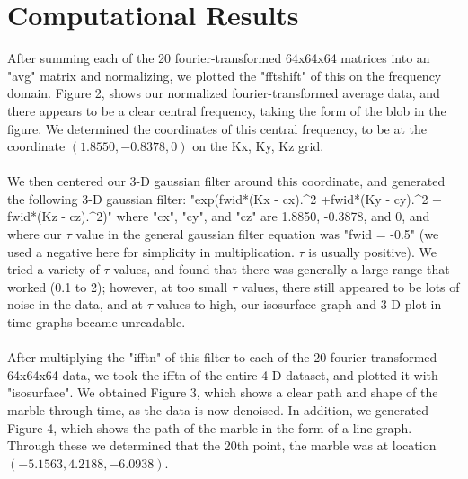 \documentclass{article}
\begin{document}
\section*{\fontsize{19}{15}\selectfont Computational Results}
	After summing each of the 20 fourier-transformed 64x64x64 matrices into an "avg" matrix and normalizing, we plotted the "fftshift" of this on the frequency domain. Figure 2, shows our normalized fourier-transformed average data, and there appears to be a clear central frequency, taking the form of the blob in the figure. We determined the coordinates of this central frequency, to be at the coordinate $(1.8550, -0.8378, 0)$ on the Kx, Ky, Kz grid. \\ \\
We then centered our 3-D gaussian filter around this coordinate, and generated the following 3-D gaussian filter: "exp(fwid*(Kx - cx).^2 +fwid*(Ky - cy).^2 + fwid*(Kz - cz).^2)" where "cx", "cy", and "cz" are 1.8850, -0.3878, and 0, and where our $\tau$ value in the general gaussian filter equation was "fwid = -0.5" (we used a negative here for simplicity in multiplication. $\tau$ is usually positive). We tried a variety of $\tau$ values, and found that there was generally a large range that worked (0.1 to 2); however, at too small $\tau$ values, there still appeared to be lots of noise in the data, and at $\tau$ values to high, our isosurface graph and 3-D plot in time graphs became unreadable. \\ \\
After multiplying the "ifftn" of this filter to each of the 20 fourier-transformed 64x64x64 data, we took the ifftn of the entire 4-D dataset, and plotted it with "isosurface". We obtained Figure 3, which shows a clear path and shape of the marble through time, as the data is now denoised. In addition, we generated Figure 4, which shows the path of the marble in the form of a line graph. Through these we determined that the 20th point, the marble was at location $(-5.1563, 4.2188, -6.0938)$.
\end{document}
